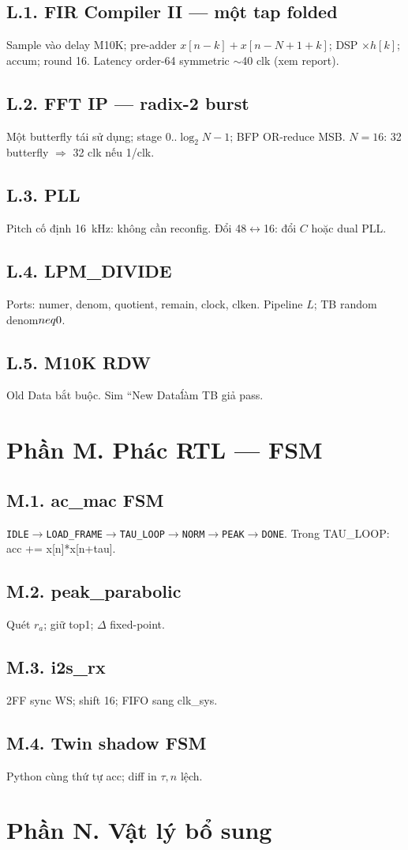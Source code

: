\subsection*{L.1. FIR Compiler II --- một tap folded}
Sample vào delay M10K; pre-adder $x[n-k]+x[n-N+1+k]$; DSP $\times h[k]$; accum; round 16. Latency order-64 symmetric $\sim$40 clk (xem report).
\subsection*{L.2. FFT IP --- radix-2 burst}
Một butterfly tái sử dụng; stage $0..\log_2 N-1$; BFP OR-reduce MSB. $N=16$: 32 butterfly $\Rightarrow$ 32 clk nếu 1/clk.
\subsection*{L.3. PLL}
Pitch cố định 16~kHz: không cần reconfig. Đổi 48$\leftrightarrow$16: đổi $C$ hoặc dual PLL.
\subsection*{L.4. LPM\_DIVIDE}
Ports: numer, denom, quotient, remain, clock, clken. Pipeline $L$; TB random denom$\\neq0$.
\subsection*{L.5. M10K RDW}
Old Data bắt buộc. Sim ``New Data\'\' làm TB giả pass.
\newpage\section*{Phần M. Phác RTL --- FSM}
\subsection*{M.1. ac\_mac FSM}
\texttt{IDLE$\to$LOAD\_FRAME$\to$TAU\_LOOP$\to$NORM$\to$PEAK$\to$DONE}. Trong TAU\_LOOP: acc += x[n]*x[n+tau].
\subsection*{M.2. peak\_parabolic}
Quét $r_a$; giữ top1; $\Delta$ fixed-point.
\subsection*{M.3. i2s\_rx}
2FF sync WS; shift 16; FIFO sang clk\_sys.
\subsection*{M.4. Twin shadow FSM}
Python cùng thứ tự acc; diff in $\tau,n$ lệch.
\newpage\section*{Phần N. Vật lý bổ sung}

